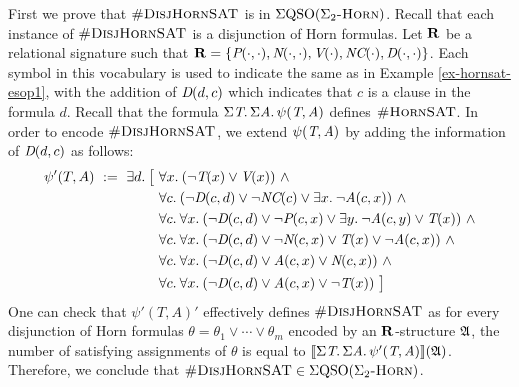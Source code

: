 First we prove that $\textsc{\#DisjHornSAT}$ is in $\Sigma{\rm QSO}(\Sigma_2\textsc{-Horn})$. Recall that each instance of $\textsc{\#DisjHornSAT}$ is a disjunction of Horn formulas. Let $\mathbf{R}$ be a relational signature such that $\mathbf{R} = \{\textit{P}(\cdot,\cdot), \textit{N}(\cdot,\cdot), \textit{V}(\cdot), \textit{NC}(\cdot), \textit{D}(\cdot,\cdot)\}$. Each symbol in this vocabulary is used to indicate the same as in Example \ref{ex-hornsat-esop1}, with the addition of $\textit{D}(d,c)$ which indicates that $c$ is a clause in the formula $d$. Recall that the formula $\Sigma{\textit{T}}.\, \Sigma{\textit{A}}.\, \psi(\textit{T},\textit{A})$
defines $\textsc{\#HornSAT}$. In order to encode $\textsc{\#DisjHornSAT}$, we extend $\psi(\textit{T},\textit{A})$ by adding the information of $\textit{D}(d,c)$ as follows:
\begin{align*}
\psi'(T,A) \ := \ \exists{d}.\: \big[ \ & \forall{x}.\: (\neg \textit{T}(x) \vee \textit{V}(x)) \ \wedge\\
& \forall{c}.\: (\neg \textit{D}(c,d)\vee \neg \textit{NC}(c) \vee  \exists{x}.\: \neg \textit{A}(c,x)) \ \wedge\\
& \forall{c}.\: \forall{x}.\: (\neg \textit{D}(c,d)\vee\neg \textit{P}(c,x) \vee \exists{y}.\: \neg \textit{A}(c,y) \vee \textit{T}(x)) \ \wedge\\
& \forall{c}.\: \forall{x}.\: (\neg \textit{D}(c,d)\vee\neg \textit{N}(c,x) \vee \textit{T}(x) \vee \neg \textit{A}(c,x)) \ \wedge\\
& \forall{c}.\: \forall{x}.\:  (\neg \textit{D}(c,d)\vee\textit{A}(c,x) \vee \textit{N}(c,x)) \ \wedge\\
& \forall{c}.\: \forall{x}.\: (\neg \textit{D}(c,d)\vee\textit{A}(c,x) \vee \neg\textit{T}(x)) \ \big]
\end{align*}
One can check that $\psi'(T,A)'$ effectively defines $\textsc{\#DisjHornSAT}$ as for every disjunction of Horn formulas $\theta = \theta_1\vee\cdots\vee\theta_m$ encoded by an $\mathbf{R}$-structure $\mathfrak{A}$, the number of satisfying assignments of $\theta$ is equal to ${\llbracket{}{\Sigma{\textit{T}}.\, \Sigma{\textit{A}}.\, \psi'(\textit{T},\textit{A})}\rrbracket}(\mathfrak{A})$.  Therefore, we conclude that $\textsc{\#DisjHornSAT} \in \Sigma{\rm QSO}(\Sigma_2\textsc{-Horn})$.

